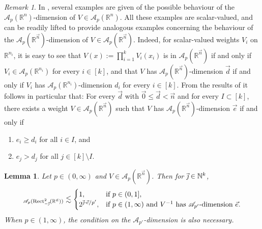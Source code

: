 \documentclass[11pt, reqno]{amsart}
\newtheorem{lemma}[theorem]{Lemma}
\theoremstyle{definition}
\theoremstyle{remark}
\newtheorem{remark}[theorem]{Remark}
\numberwithin{equation}{section}
\newcommand{\A}{\mathscr A}
\newcommand{\N}{\mathbb N}
\newcommand{\R}{\mathbb R}
\newcommand{\vnull}{\vec 0}
\newcommand{\vd}{\vec d}
\newcommand{\ve}{\vec e}
\newcommand{\vj}{\vec{\textit{\j}}}
\newcommand{\vn}{\vec n}
\newcommand{\Rect}{\mathrm{Rect}}
\begin{document}
\begin{remark}
In \cite[Section 2.2]{BHYY:1a}, several examples are given of
the possible behaviour of the $\A_p(\R^n)$-dimension of $V\in\A_p(\R^n)$.
All these examples are scalar-valued, and can be readily lifted to
provide analogous examples concerning the behaviour of
the $\A_p(\R^{\vn})$-dimension of $V\in\A_p(\R^{\vn})$.
Indeed, for scalar-valued  weights $V_i$ on $\R^{n_i}$,
it is easy to see that $V(x):=\prod_{i=1}^k V_i(x_i)$ is in $\A_p(\R^{\vn})$
if and only if $V_i\in\A_p(\R^{n_i})$ for every $i\in[k]$,
and that $V$ has $\A_p(\R^{\vn})$-dimension $\vd$ if and only if
$V_i$ has $\A_p(\R^{n_i})$-dimension $d_i$ for every $i\in[k]$.
From the results of \cite[Section 2.2]{BHYY:1a}
it follows in particular that:
For every $\vd$ with $\vnull\leq\vd<\vn$ and for every $I\subset[k]$,
there exists a weight $V\in\A_p(\R^{\vn})$ such that
$V$ has $\A_p(\R^{\vn})$-dimension $\ve$ if and only if
\begin{enumerate}[\rm(i)]
\item $e_i\geq d_i$ for all $i\in I$, and
\item $e_j>d_j$ for all $j\in[k]\setminus I$.
\end{enumerate}
\end{remark}

\begin{lemma}\label{lem 2.18}
Let $p\in(0,\infty)$ and $V\in\A_p(\R^{\vn})$. Then for $\vj\in\N^k$,
\begin{equation*}
[V]_{\A_p(\Rect^2_{-\vj}(\R^{\vn}))}\lesssim\begin{cases} 1, & \text{if }p\in(0,1], \\ 2^{\vj\cdot\ve/p'}, &
\text{if }p\in(1,\infty)\text{ and }V^{-1}\text{ has }\A_{p'}\text{-dimension }\ve.\end{cases}
\end{equation*}
When $p\in(1,\infty)$, the condition on the $\A_{p'}$-dimension is also necessary.
\end{lemma}
\end{document}
